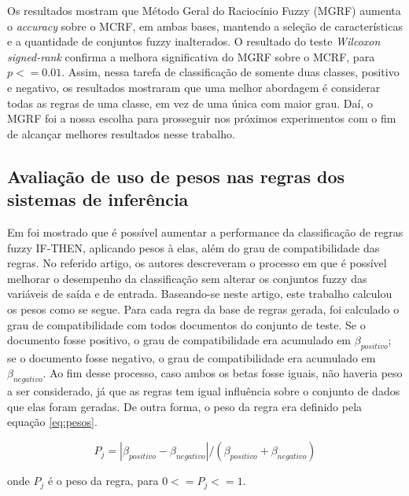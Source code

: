 %
%
%

Os resultados mostram que Método Geral do Raciocínio Fuzzy (MGRF) aumenta o \textit{accuracy} sobre o MCRF, em ambas bases,  mantendo a seleção de características e a quantidade de conjuntos fuzzy inalterados. O resultado do teste \textit{Wilcoxon signed-rank} confirma a melhora significativa do MGRF sobre o MCRF, para $p <= 0.01$. Assim, nessa tarefa de classificação de somente duas classes, positivo e negativo, os resultados mostraram que uma melhor abordagem é considerar todas as regras de uma classe, em vez de uma única com maior grau. Daí, o MGRF foi a nossa escolha para prosseguir nos próximos experimentos com o fim de alcançar melhores resultados nesse trabalho.

\subsection{Avaliação de uso de pesos nas regras dos sistemas de inferência}

Em \cite{ishibuchi2001effect} foi mostrado que é possível aumentar a performance da classificação de regras fuzzy IF-THEN, aplicando pesos à elas, além do grau de compatibilidade das regras. No referido artigo, os autores descreveram o processo em que é possível melhorar o desempenho da classificação sem alterar os conjuntos fuzzy das variáveis de saída e de entrada. Baseando-se neste artigo, este trabalho calculou os pesos como se segue. Para cada regra da base de regras gerada, foi calculado o grau de compatibilidade com todos documentos do conjunto de teste. Se o documento fosse positivo, o grau de compatibilidade era acumulado em $\beta_{positivo}$; se o documento fosse negativo, o grau de compatibilidade era acumulado em $\beta_{negativo}$. Ao fim desse processo, caso ambos os betas fosse iguais, não haveria peso a ser considerado, já que as regras tem igual influência sobre o conjunto de dados que elas foram geradas. De outra forma, o peso da regra era definido pela equação \ref{eq:pesos}.

\begin{equation}
P_j = |\beta_{positivo} - \beta_{negativo}| / (\beta_{positivo} + \beta_{negativo})
\label{eq:pesos}
\end{equation}

onde $P_j$ é o peso da regra, para $0 <= P_j <= 1$. 


